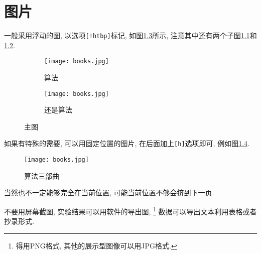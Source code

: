 \chapter{图片}

  一般采用浮动的图, 以选项\texttt{[!htbp]}标记, 如图\ref{fig:algorithm}所示,
注意其中还有两个子图\ref{fig:algorithm:a}和\ref{fig:algorithm:b}.

\begin{figure}[!htbp]
\centering
\begin{subfigure}[t]{.3\textwidth}
  \centering
  \texttt{[image: books.jpg]}
  \caption{算法}
  \label{fig:algorithm:a}
\end{subfigure}
\quad
\begin{subfigure}[t]{.3\textwidth}
  \centering
  \texttt{[image: books.jpg]}
  \caption{还是算法}
  \label{fig:algorithm:b}
\end{subfigure}
\caption{主图}
\label{fig:algorithm}
\end{figure}


  如果有特殊的需要, 可以用固定位置的图片, 在后面加上\texttt{[h]}选项即可, 例如图\ref{fig:books}.

\begin{figure}[h]
    \centering
    \texttt{[image: books.jpg]}
    \caption{算法三部曲}
    \label{fig:books}
\end{figure}

  当然也不一定能够完全在当前位置, 可能当前位置不够会挤到下一页.

  不要用屏幕截图, 实验结果可以用软件的导出图,%
\footnote{得用PNG格式, 其他的展示型图像可以用JPG格式.}
数据可以导出文本利用表格或者抄录形式.
